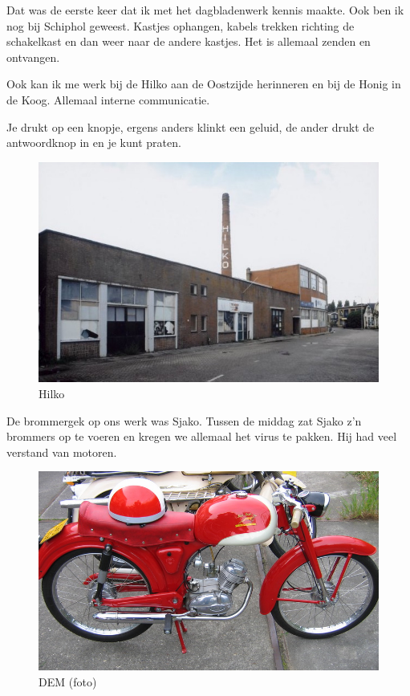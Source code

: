 \documentclass[10pt,twoside, openright]{memoir}
\begin{document}
Dat was de eerste keer dat ik met het dagbladenwerk kennis maakte. Ook ben ik nog bij Schiphol geweest. Kastjes ophangen, kabels trekken richting de schakelkast en dan weer naar de andere kastjes. Het is allemaal zenden en ontvangen. 

Ook kan ik me werk bij de Hilko aan de Oostzijde herinneren en bij de Honig in de Koog. Allemaal interne communicatie. 

Je drukt op een knopje, ergens anders klinkt een geluid, de ander drukt de antwoordknop in en je kunt praten.	

\begin{figure}
\includegraphics[width=\textwidth]{img/ch32/Hilko2}
\caption*{\footnotesize Hilko}
\end{figure}

De brommergek op ons werk was Sjako. Tussen de middag zat Sjako z'n brommers op te voeren en kregen we allemaal het virus te pakken. Hij had veel verstand van motoren. 

\begin{figure}
\includegraphics[width=\textwidth]{img/ch32/image-5}
\caption*{\footnotesize DEM (foto)}
\end{figure}
\end{document}
